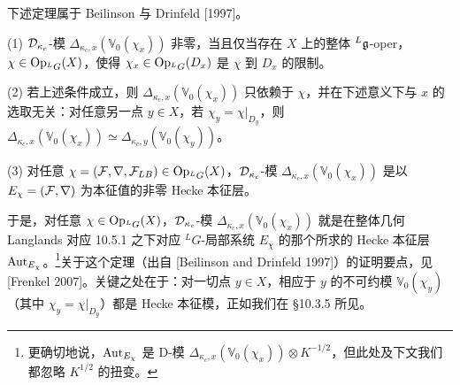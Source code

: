 下述定理属于 Beilinson 与 Drinfeld [1997]。

\begin{theorem}
    (1) $\mathcal{D}_{\kappa_c}$-模 $\Delta_{\kappa_c,x}(\mathbb{V}_0(\chi_x))$ 非零，当且仅当存在 $X$ 上的整体 ${}^L\mathfrak{g}$-oper，$\chi\in\operatorname{Op}_{{}^L G}(X)$，使得 $\chi_x\in\operatorname{Op}_{{}^L G}(D_x)$ 是 $\chi$ 到 $D_x$ 的限制。

    (2) 若上述条件成立，则 $\Delta_{\kappa_c,x}(\mathbb{V}_0(\chi_x))$ 只依赖于 $\chi$，并在下述意义下与 $x$ 的选取无关：对任意另一点 $y\in X$，若 $\chi_y=\chi|_{D_y}$，则 $\Delta_{\kappa_c,x}(\mathbb{V}_0(\chi_x))\simeq\Delta_{\kappa_c,y}(\mathbb{V}_0(\chi_y))$。

    (3) 对任意 $\chi=(\mathcal{F},\nabla,\mathcal{F}_{LB})\in\operatorname{Op}_{{}^L G}(X)$，$\mathcal{D}_{\kappa_c}$-模 $\Delta_{\kappa_c,x}(\mathbb{V}_0(\chi_x))$ 是以 $E_\chi=(\mathcal{F},\nabla)$ 为本征值的非零 Hecke 本征层。
\end{theorem}


于是，对任意 $\chi\in\operatorname{Op}_{{}^L G}(X)$，$\mathcal{D}_{\kappa_c}$-模 $\Delta_{\kappa_c,x}(\mathbb{V}_0(\chi_x))$ 就是在整体几何 Langlands 对应 10.5.1 之下对应 ${}^L G$-局部系统 $E_\chi$ 的那个所求的 Hecke 本征层 $\operatorname{Aut}_{E_\chi}$。\footnote{更确切地说，$\operatorname{Aut}_{E_\chi}$ 是 D-模 $\Delta_{\kappa_c,x}(\mathbb{V}_0(\chi_x))\otimes K^{-1/2}$，但此处及下文我们都忽略 $K^{1/2}$ 的扭变。}关于这个定理（出自 [Beilinson and Drinfeld 1997]）的证明要点，见 [Frenkel 2007]。关键之处在于：对一切点 $y\in X$，相应于 $y$ 的不可约模 $\mathbb{V}_0(\chi_y)$（其中 $\chi_y=\chi|_{D_y}$）都是 Hecke 本征模，正如我们在 §10.3.5 所见。

